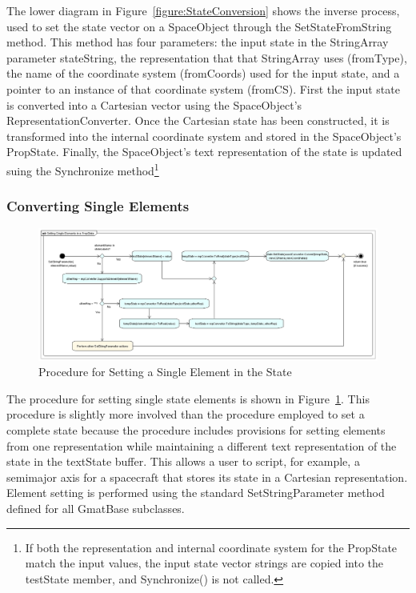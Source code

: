 The lower diagram in Figure~\ref{figure:StateConversion} shows the inverse process, used to set the
state vector on a SpaceObject through the SetStateFromString method.  This method has four
parameters: the input state in the StringArray parameter stateString, the representation that that
StringArray uses (fromType), the name of the coordinate system (fromCoords) used for the input
state, and a pointer to an instance of that coordinate system (fromCS).  First the input state is
converted into a Cartesian vector using the SpaceObject's RepresentationConverter.  Once the
Cartesian state has been constructed, it is transformed into the internal coordinate system and
stored in the SpaceObject's PropState.  Finally, the SpaceObject's text representation of the state
is updated suing the Synchronize method\footnote{If both the representation and internal coordinate
system for the PropState match the input values, the input state vector strings are copied into the
testState member, and Synchronize() is not called.}

\subsubsection{Converting Single Elements}

\begin{figure}[htb]
\begin{center}
\includegraphics[430,186]{Images/SettingSingleElementsinanOrbitState.png}
\caption{\label{figure:StateElementConversion}Procedure for Setting a Single Element in the State}
\end{center}
\end{figure}

The procedure for setting single state elements is shown in
Figure~\ref{figure:StateElementConversion}.  This procedure is slightly more involved than the
procedure employed to set a complete state because the procedure includes provisions for setting
elements from one representation while maintaining a different text representation of the state in
the textState buffer.  This allows a user to script, for example, a semimajor axis for a spacecraft
that stores its state in a Cartesian representation.  Element setting is performed using the
standard SetStringParameter method defined for all GmatBase subclasses.

